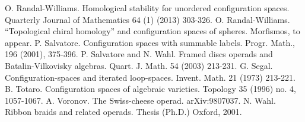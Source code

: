 \documentclass{compositio}
\theoremstyle{definition}\newtheorem{definition}{Definition}[section]
\theoremstyle{theorem}\newtheorem{lemma}[definition]{Lemma}
\theoremstyle{remark}\newtheorem*{conventions}{Conventions}
\theoremstyle{remark}\newtheorem*{acknowledgments}{Acknowledgments}
\theoremstyle{remark}\newtheorem*{outline}{Outline}
\theoremstyle{remark}\newtheorem*{questions}{Questions}
\theoremstyle{remark}\newtheorem{example}[definition]{Example}
\theoremstyle{definition}\newtheorem{construction}[definition]{Construction}
\theoremstyle{definition}\newtheorem*{convention}{Convention}
\theoremstyle{definition}\newtheorem*{conjecture}{Conjecture}
\theoremstyle{theorem}\newtheorem{theorem}[definition]{Theorem}
\theoremstyle{theorem}\newtheorem{paradigm}[definition]{Paradigm}
\theoremstyle{remark}\newtheorem{remark}[definition]{Remark}
\theoremstyle{corollary}\newtheorem{corollary}[definition]{Corollary}
\theoremstyle{theorem}\newtheorem{proposition}[definition]{Proposition}
\theoremstyle{definition}\newtheorem{question}[definition]{Question}
\begin{document}
\begin{thebibliography}{100}
 O. Randal-Williams. Homological stability for unordered configuration spaces. Quarterly Journal of Mathematics 64 (1) (2013) 303-326.
 O. Randal-Williams. ``Topological chiral homology'' and configuration spaces of spheres. Morfismos, to appear.
 P. Salvatore. Configuration spaces with summable labels. Progr. Math., 196 (2001), 375-396.
 P. Salvatore and N. Wahl. Framed discs operads and Batalin-Vilkovisky algebras. Quart. J. Math. 54 (2003) 213-231. 
 G. Segal. Configuration-spaces and iterated loop-spaces. Invent. Math. 21 (1973) 213-221.
 B. Totaro. Configuration spaces of algebraic varieties. Topology 35 (1996) no. 4, 1057-1067.
 A. Voronov. The Swiss-cheese operad. 	arXiv:9807037.
 N. Wahl. Ribbon braids and related operads. Thesis (Ph.D.) Oxford, 2001.
\end{thebibliography}
\end{document}
